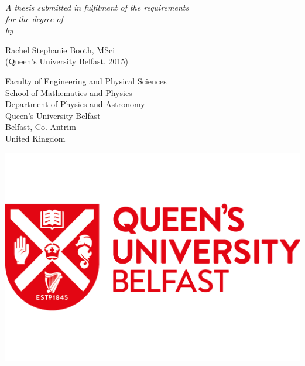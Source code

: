 \documentclass[
12pt, %
oneside, %
english, %
onehalfspacing, %
liststotoc, %
headsepline, %
]{MastersDoctoralThesis} %
\author{Rachel Stephanie \textsc{Booth}} %
\begin{document}
\frontmatter %

\pagestyle{plain} %


\begin{titlepage}
\begin{center}

\vspace*{.06\textheight}
{\textcolor{red}\scshape\LARGE \textbf{\ttitle}\par}\vspace{1.0cm}

\large \textit{A thesis submitted in fulfilment of the requirements\\ for the degree of \degreename}\\[0.2cm]

\vspace*{.01\textheight}
\large \textit{by}
\vspace*{.01\textheight}

\LARGE Rachel Stephanie Booth, MSci \\
\vspace*{.01\textheight}
\LARGE (Queen's University Belfast, 2015)

\vspace*{.02\textheight}

\large Faculty of Engineering and Physical Sciences\\
School of Mathematics and Physics\\Department of Physics and Astronomy\\Queen’s University Belfast\\Belfast, Co. Antrim\\United Kingdom

\vspace*{0.02\textheight}

\includegraphics[scale=0.12]{Figures/QUB_logo2}


\end{center}
\end{titlepage}
\end{document}
